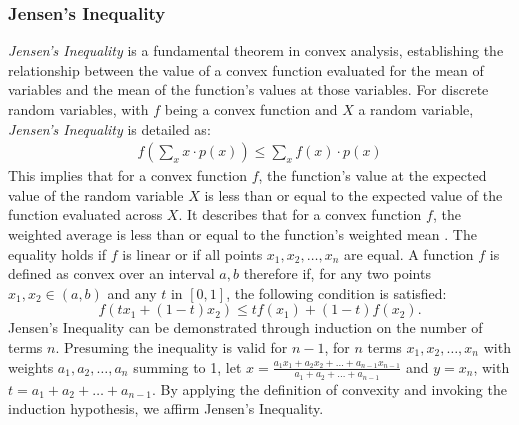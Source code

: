 \documentclass[journal,12pt,onecolumn,draftclsnofoot,]{IEEEtran}
\begin{document}
	\subsubsection{Jensen's Inequality}
	\emph{Jensen's Inequality} is a fundamental theorem in convex analysis, establishing the  relationship between the value of a convex function evaluated for the mean of variables and the mean of the function's values at those variables. For discrete random variables, with \(f\) being a convex function and \(X\) a random variable, \emph{Jensen's Inequality} is detailed as:
	\begin{align}
		f\left(\sum_{x} x \cdot p(x)\right) \leq \sum_{x} f(x) \cdot p(x)
	\end{align}
	This implies that for a convex function \(f\), the function's value at the expected value of the random variable \(X\) is less than or equal to the expected value of the function evaluated across \(X\). It describes that for a convex function \(f\), the weighted average is less than or equal to the function's weighted mean . The equality holds if \(f\) is linear or if all points \(x_1, x_2, \ldots, x_n\) are equal. A function \(f\) is defined as convex over an interval \(a, b\) therefore if, for any two points \(x_1, x_2 \in (a, b)\) and any \(t\) in \([0, 1]\), the following condition is satisfied:
	\[
	f(tx_1 + (1-t)x_2) \leq tf(x_1) + (1-t)f(x_2).
	\]
	Jensen's Inequality can be demonstrated through induction on the number of terms \(n\). Presuming the inequality is valid for \(n-1\), for \(n\) terms \(x_1, x_2, \ldots, x_n\) with weights \(a_1, a_2, \ldots, a_n\) summing to 1, let \(x = \frac{a_1x_1 + a_2x_2 + \ldots + a_{n-1}x_{n-1}}{a_1 + a_2 + \ldots + a_{n-1}}\) and \(y = x_n\), with \(t = a_1 + a_2 + \ldots + a_{n-1}\). By applying the definition of convexity and invoking the induction hypothesis, we affirm Jensen's Inequality.
\end{document}

